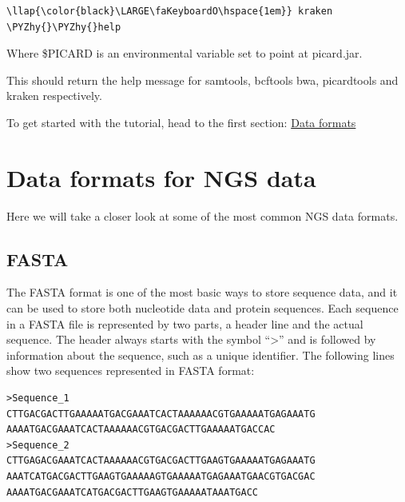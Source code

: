 \documentclass[11pt]{article}
\def\PYZhy{\char`\-}
\begin{document}
\begin{terminalinput}
\begin{Verbatim}[commandchars=\\\{\}]
\llap{\color{black}\LARGE\faKeyboardO\hspace{1em}} kraken \PYZhy{}\PYZhy{}help
\end{Verbatim}
\end{terminalinput}

    Where \$PICARD is an environmental variable set to point at picard.jar.

This should return the help message for samtools, bcftools bwa,
picardtools and kraken respectively.

To get started with the tutorial, head to the first section:
\href{formats.ipynb}{Data formats}





\newpage






    \hypertarget{data-formats-for-ngs-data}{%
\section{Data formats for NGS data}\label{data-formats-for-ngs-data}}

Here we will take a closer look at some of the most common NGS data
formats.

    \hypertarget{fasta}{%
\subsection{FASTA}\label{fasta}}

The FASTA format is one of the most basic ways to store sequence data,
and it can be used to store both nucleotide data and protein sequences.
Each sequence in a FASTA file is represented by two parts, a header line
and the actual sequence. The header always starts with the symbol
``\textgreater{}'' and is followed by information about the sequence,
such as a unique identifier. The following lines show two sequences
represented in FASTA format:

\begin{verbatim}
>Sequence_1
CTTGACGACTTGAAAAATGACGAAATCACTAAAAAACGTGAAAAATGAGAAATG
AAAATGACGAAATCACTAAAAAACGTGACGACTTGAAAAATGACCAC
>Sequence_2
CTTGAGACGAAATCACTAAAAAACGTGACGACTTGAAGTGAAAAATGAGAAATG
AAATCATGACGACTTGAAGTGAAAAAGTGAAAAATGAGAAATGAACGTGACGAC
AAAATGACGAAATCATGACGACTTGAAGTGAAAAATAAATGACC
\end{verbatim}
\end{document}
